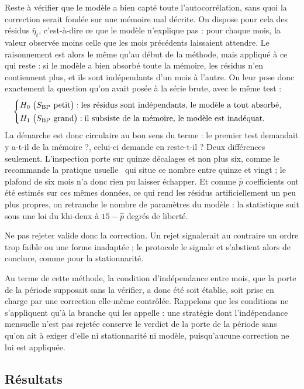 Reste à vérifier que le modèle a bien capté toute l'autocorrélation, sans
quoi la correction serait fondée sur une mémoire mal décrite. On dispose pour
cela des résidus \(\hat\eta_t\), c'est-à-dire ce que le modèle
n'explique pas : pour chaque mois, la valeur observée moins celle que les
mois précédents laissaient attendre. Le raisonnement est alors le même qu'au
début de la méthode, mais appliqué à ce qui reste : si le modèle a bien
absorbé toute la mémoire, les résidus n'en contiennent plus, et ils sont
indépendants d'un mois à l'autre. On leur pose donc exactement la question
qu'on avait posée à la série brute, avec le même test :
\[
  \begin{cases}
    H_0 \;\bigl(S_{\mathrm{BP}} \text{ petit}\bigr) : \text{les résidus sont indépendants, le modèle a tout absorbé,}\\[2pt]
    H_1 \;\bigl(S_{\mathrm{BP}} \text{ grand}\bigr) : \text{il subsiste de la mémoire, le modèle est inadéquat.}
  \end{cases}
\]
La démarche est donc circulaire au bon sens du terme : le premier test
demandait y a-t-il de la mémoire ?, celui-ci demande en
reste-t-il ? Deux différences seulement. L'inspection porte sur quinze
décalages et non plus six, comme le recommande la pratique
usuelle~\cite{boxpierce1970} qui situe ce nombre entre quinze et vingt ; le
plafond de six mois n'a donc rien pu laisser échapper. Et comme \(\hat p\)
coefficients ont été estimés sur ces mêmes données, ce qui rend les résidus
artificiellement un peu plus propres, on retranche le nombre de paramètres du
modèle : la statistique suit sous \Hzero{} une loi du khi-deux à
\(15 - \hat p\) degrés de liberté.

Ne pas rejeter valide donc la correction. Un rejet signalerait au contraire
un ordre trop faible ou une forme inadaptée ; le protocole le signale et
s'abstient alors de conclure, comme pour la stationnarité.

Au terme de cette méthode, la condition d'indépendance entre mois, que la
porte de la période supposait sans la vérifier, a donc été soit établie, soit
prise en charge par une correction elle-même contrôlée. Rappelons que les
conditions ne s'appliquent qu'à la branche qui les appelle : une stratégie
dont l'indépendance mensuelle n'est pas rejetée conserve le verdict de la
porte de la période sans qu'on ait à exiger d'elle ni stationnarité ni modèle,
puisqu'aucune correction ne lui est appliquée.

\subsection{Résultats}

